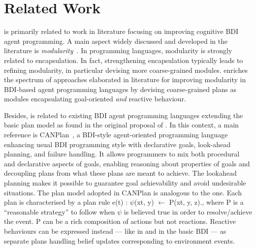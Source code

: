 \section{Related Work}
\label{sec:related}

{\aser} is primarily related to work in literature focusing on improving cognitive BDI agent programming.
%
%
A main aspect widely discussed and developed in the literature is  \emph{modularity}~\cite{Madden2010,Busetta2000,5285116,Novak:2006:MBA:1160633.1160814,Ortiz-Hernandez2016,vanRiemsdijk:2006:GMA:1160633.1160864,Hindriks2008,Nunes2014}.
%
In programming languages, modularity is strongly related to encapsulation. In fact,  strengthening encapsulation typically leads to refining modularity, in particular devising more coarse-grained modules.
%
{\aser} enriches the spectrum of approaches elaborated in literature for improving modularity in BDI-based agent programming languages by devising coarse-grained plans as modules encapsulating goal-oriented \emph{and} reactive behaviour. 

Besides, {\aser} is related to existing BDI agent programming languages extending the basic plan model as found in the original proposal of {\asl}.
%
In this context, a main reference is \textsf{CANPlan}~\cite{Sardina2011}, a  BDI-style agent-oriented programming language enhancing usual BDI programming style with declarative goals, look-ahead planning, and failure handling. 
%
It allows programmers to mix both procedural and declarative aspects of goals, enabling reasoning about properties of goals and decoupling plans from what these plans are meant to achieve. 
%
The lookahead planning makes it possible to guarantee goal achievability and avoid undesirable situations. 
%
The plan model adopted in {\textsf{CANPlan}} is analogous to the {\asl} one. Each plan is characterised by a plan rule \textsf{e(t) : $\psi$(xt, y) $\leftarrow$ P(xt, y, z).}, where \textsf{P} is a ``reasonable strategy'' to follow when \textsf{$\psi$} is believed true in order to resolve/achieve the event.
%
\textsf{P} can be a rich composition of actions but not reactions.  
%
Reactive behaviours can be expressed instead --- like in {\asl} and in the basic BDI --- as separate plans handling belief updates corresponding  to environment events. 

